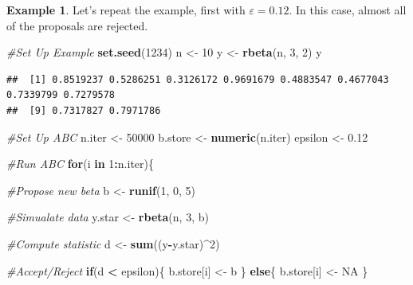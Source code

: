 \documentclass[
]{book}
\newenvironment{Shaded}{\begin{snugshade}}{\end{snugshade}}
\newcommand{\CommentTok}[1]{\textcolor[rgb]{0.56,0.35,0.01}{\textit{#1}}}
\newcommand{\ConstantTok}[1]{\textcolor[rgb]{0.56,0.35,0.01}{#1}}
\newcommand{\ControlFlowTok}[1]{\textcolor[rgb]{0.13,0.29,0.53}{\textbf{#1}}}
\newcommand{\DecValTok}[1]{\textcolor[rgb]{0.00,0.00,0.81}{#1}}
\newcommand{\FloatTok}[1]{\textcolor[rgb]{0.00,0.00,0.81}{#1}}
\newcommand{\FunctionTok}[1]{\textcolor[rgb]{0.13,0.29,0.53}{\textbf{#1}}}
\newcommand{\NormalTok}[1]{#1}
\newcommand{\OtherTok}[1]{\textcolor[rgb]{0.56,0.35,0.01}{#1}}
\newcommand{\SpecialCharTok}[1]{\textcolor[rgb]{0.81,0.36,0.00}{\textbf{#1}}}
\theoremstyle{definition}
\theoremstyle{definition}
\newtheorem{example}{Example}[chapter]
\theoremstyle{definition}
\theoremstyle{definition}
\theoremstyle{remark}
\begin{document}
\begin{example}

Let's repeat the example, first with \(\varepsilon = 0.12\). In this case, almost all of the proposals are rejected.

\begin{Shaded}
\begin{Highlighting}[]
\CommentTok{\#Set Up Example}
\FunctionTok{set.seed}\NormalTok{(}\DecValTok{1234}\NormalTok{)}
\NormalTok{n }\OtherTok{\textless{}{-}} \DecValTok{10}
\NormalTok{y }\OtherTok{\textless{}{-}} \FunctionTok{rbeta}\NormalTok{(n, }\DecValTok{3}\NormalTok{, }\DecValTok{2}\NormalTok{)}
\NormalTok{y}
\end{Highlighting}
\end{Shaded}

\begin{verbatim}
##  [1] 0.8519237 0.5286251 0.3126172 0.9691679 0.4883547 0.4677043 0.7339799 0.7279578
##  [9] 0.7317827 0.7971786
\end{verbatim}

\begin{Shaded}
\begin{Highlighting}[]
\CommentTok{\#Set Up ABC}
\NormalTok{n.iter }\OtherTok{\textless{}{-}} \DecValTok{50000}
\NormalTok{b.store }\OtherTok{\textless{}{-}} \FunctionTok{numeric}\NormalTok{(n.iter)}
\NormalTok{epsilon }\OtherTok{\textless{}{-}} \FloatTok{0.12}

\CommentTok{\#Run ABC}
\ControlFlowTok{for}\NormalTok{(i }\ControlFlowTok{in} \DecValTok{1}\SpecialCharTok{:}\NormalTok{n.iter)\{}
  
  \CommentTok{\#Propose new beta}
\NormalTok{  b }\OtherTok{\textless{}{-}} \FunctionTok{runif}\NormalTok{(}\DecValTok{1}\NormalTok{, }\DecValTok{0}\NormalTok{, }\DecValTok{5}\NormalTok{)}
  
  \CommentTok{\#Simualate data}
\NormalTok{  y.star }\OtherTok{\textless{}{-}} \FunctionTok{rbeta}\NormalTok{(n, }\DecValTok{3}\NormalTok{, b)}
  
  \CommentTok{\#Compute statistic}
\NormalTok{  d }\OtherTok{\textless{}{-}} \FunctionTok{sum}\NormalTok{((y}\SpecialCharTok{{-}}\NormalTok{y.star)}\SpecialCharTok{\^{}}\DecValTok{2}\NormalTok{)}
  
  \CommentTok{\#Accept/Reject}
  \ControlFlowTok{if}\NormalTok{(d }\SpecialCharTok{\textless{}}\NormalTok{ epsilon)\{}
\NormalTok{    b.store[i] }\OtherTok{\textless{}{-}}\NormalTok{ b}
\NormalTok{  \} }\ControlFlowTok{else}\NormalTok{\{}
\NormalTok{    b.store[i] }\OtherTok{\textless{}{-}} \ConstantTok{NA}
\NormalTok{  \}}
  

\end{Highlighting}
\end{Shaded}
\end{example}
\end{document}
